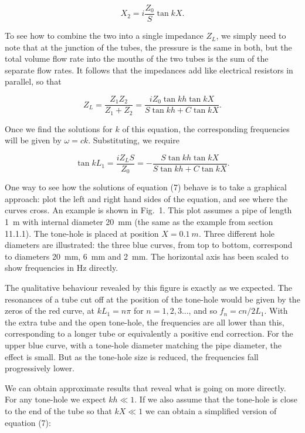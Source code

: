   $$X_2=i\dfrac{Z_0}{S} \tan kX . \tag{5}$$ 

  To see how to combine the two into a single impedance $Z_L$, we simply need 
  to note that at the junction of the tubes, the pressure is the same in both, 
  but the total volume flow rate into the mouths of the two tubes is the sum of 
  the separate flow rates. It follows that the impedances add like electrical 
  resistors in parallel, so that 

  $$Z_L=\dfrac{Z_1 Z_2}{Z_1 + Z_2} = \dfrac{i Z_0 \tan kh \tan kX}{S \tan kh + 
  C \tan kX} . \tag{6}$$ 

  Once we find the solutions for $k$ of this equation, the corresponding 
  frequencies will be given by $\omega=ck$. Substituting, we require 

  $$\tan kL_1 = \dfrac{iZ_L S}{Z_0} = -\dfrac{S\tan kh \tan kX}{S \tan kh + C 
  \tan kX} . \tag{7}$$ 

  One way to see how the solutions of equation (7) behave is to take a 
  graphical approach: plot the left and right hand sides of the equation, and 
  see where the curves cross. An example is shown in Fig.\ 1. This plot assumes 
  a pipe of length 1~m with internal diameter 20~mm (the same as the example 
  from section 11.1.1). The tone-hole is placed at position $X=0.1\mathrm~m$. 
  Three different hole diameters are illustrated: the three blue curves, from 
  top to bottom, correspond to diameters 20~mm, 6~mm and 2~mm. The horizontal 
  axis has been scaled to show frequencies in Hz directly. 


  The qualitative behaviour revealed by this figure is exactly as we expected. 
  The resonances of a tube cut off at the position of the tone-hole would be 
  given by the zeros of the red curve, at $kL_1=n \pi$ for $n=1,2,3...$, and so 
  $f_n=cn/2L_1$. With the extra tube and the open tone-hole, the frequencies 
  are all lower than this, corresponding to a longer tube or equivalently a 
  positive end correction. For the upper blue curve, with a tone-hole diameter 
  matching the pipe diameter, the effect is small. But as the tone-hole size is 
  reduced, the frequencies fall progressively lower. 

  We can obtain approximate results that reveal what is going on more directly. 
  For any tone-hole we expect $kh \ll 1$. If we also assume that the tone-hole 
  is close to the end of the tube so that $kX \ll 1$ we can obtain a simplified 
  version of equation (7): 


